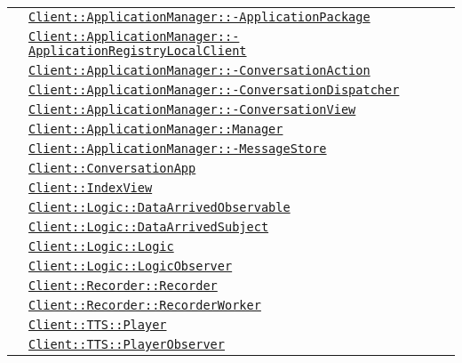 \begin{longtable}{|>{\centering}m{3cm}|m{10cm}<{\centering}|}
& \hyperref[Client::ApplicationManager::ApplicationPackage]{\texttt{Client::ApplicationManager::-\linebreak ApplicationPackage}}\\
& \hyperref[Client::ApplicationManager::ApplicationRegistryLocalClient]{\texttt{Client::ApplicationManager::-\linebreak ApplicationRegistryLocalClient}}\\
& \hyperref[Client::ApplicationManager::ConversationAction]{\texttt{Client::ApplicationManager::-\linebreak ConversationAction}}\\
& \hyperref[Client::ApplicationManager::ConversationDispatcher]{\texttt{Client::ApplicationManager::-\linebreak ConversationDispatcher}}\\
& \hyperref[Client::ApplicationManager::ConversationView]{\texttt{Client::ApplicationManager::-\linebreak ConversationView}}\\
& \hyperref[Client::ApplicationManager::Manager]{\texttt{Client::ApplicationManager::Manager}}\\
& \hyperref[Client::ApplicationManager::MessageStore]{\texttt{Client::ApplicationManager::-\linebreak MessageStore}}\\
& \hyperref[Client::ConversationApp]{\texttt{Client::ConversationApp}}\\
& \hyperref[Client::IndexView]{\texttt{Client::IndexView}}\\
& \hyperref[Client::Logic::DataArrivedObservable]{\texttt{Client::Logic::DataArrivedObservable}}\\
& \hyperref[Client::Logic::DataArrivedSubject]{\texttt{Client::Logic::DataArrivedSubject}}\\
& \hyperref[Client::Logic::Logic]{\texttt{Client::Logic::Logic}}\\
& \hyperref[Client::Logic::LogicObserver]{\texttt{Client::Logic::LogicObserver}}\\
& \hyperref[Client::Recorder::Recorder]{\texttt{Client::Recorder::Recorder}}\\
& \hyperref[Client::Recorder::RecorderWorker]{\texttt{Client::Recorder::RecorderWorker}}\\
& \hyperref[Client::TTS::Player]{\texttt{Client::TTS::Player}}\\
& \hyperref[Client::TTS::PlayerObserver]{\texttt{Client::TTS::PlayerObserver}}\\ \hline


\end{longtable}

